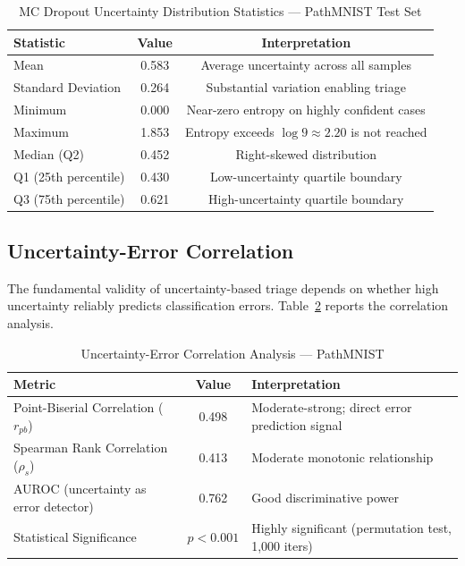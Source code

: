 \begin{table}[h]
\footnotesize
\centering
\caption{MC Dropout Uncertainty Distribution Statistics — PathMNIST Test Set}
\label{tab:ch5_unc_stats}
\begin{tabular}{lcc}
\toprule
\textbf{Statistic} & \textbf{Value} & \textbf{Interpretation} \\
\midrule
Mean                   & 0.583  & Average uncertainty across all samples \\
Standard Deviation     & 0.264  & Substantial variation enabling triage \\
Minimum                & 0.000  & Near-zero entropy on highly confident cases \\
Maximum                & 1.853  & Entropy exceeds $\log 9 \approx 2.20$ is not reached \\
Median (Q2)            & 0.452  & Right-skewed distribution \\
Q1 (25th percentile)   & 0.430  & Low-uncertainty quartile boundary \\
Q3 (75th percentile)   & 0.621  & High-uncertainty quartile boundary \\
\bottomrule
\end{tabular}
\end{table}

\subsection{Uncertainty-Error Correlation}

The fundamental validity of uncertainty-based triage depends on whether high uncertainty reliably predicts classification errors. Table~\ref{tab:ch5_unc_corr} reports the correlation analysis.

\begin{table}[h]
\footnotesize
\centering
\caption{Uncertainty-Error Correlation Analysis — PathMNIST}
\label{tab:ch5_unc_corr}
\begin{tabular}{lcl}
\toprule
\textbf{Metric} & \textbf{Value} & \textbf{Interpretation} \\
\midrule
Point-Biserial Correlation ($r_{pb}$) & 0.498 & Moderate-strong; direct error prediction signal \\
Spearman Rank Correlation ($\rho_s$)  & 0.413 & Moderate monotonic relationship \\
AUROC (uncertainty as error detector) & 0.762 & Good discriminative power \\
Statistical Significance              & $p < 0.001$ & Highly significant (permutation test, 1,000 iters) \\
\bottomrule
\end{tabular}
\end{table}

